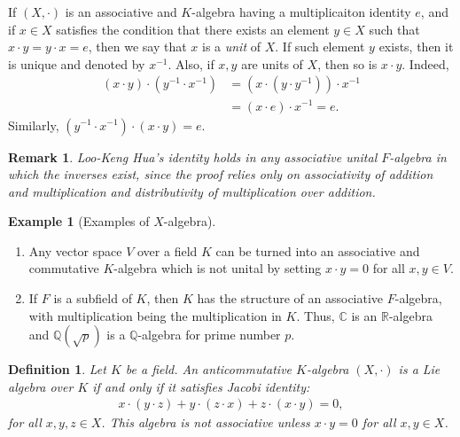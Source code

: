 \documentclass[10pt]{book}
\newtheorem{definition}{Definition}[chapter]
\newtheorem{remark}{Remark}[chapter]
\theoremstyle{definition}
\newtheorem{example}{Example}[chapter]
\numberwithin{equation}{chapter}
\begin{document}
If $(X,\cdot)$ is an associative and $K$-algebra having a multiplicaiton identity $e$, and if $x\in X$ satisfies the condition that there exists an element $y\in X$ such that $x\cdot y = y\cdot x = e$, then we say that $x$ is a \emph{unit} of $X$. If such element $y$ exists, then it is unique and denoted by $x^{-1}$. Also, if $x,y$ are units of $X$, then so is $x\cdot y$. Indeed,
\begin{align*}
    (x\cdot y)\cdot \left(y^{-1}\cdot x^{-1}\right) & = \left(x\cdot \left(y\cdot y^{-1}\right)\right)\cdot x^{-1} \\
    & = (x\cdot e)\cdot x^{-1} = e.
\end{align*}
Similarly, $\left(y^{-1}\cdot x^{-1}\right)\cdot(x\cdot y) = e$. 
\begin{remark}{\rm \cite{2}}
Loo-Keng Hua’s identity holds in any associative unital $F$-algebra in which the inverses exist, since the proof relies only on associativity of addition and multiplication and distributivity of multiplication over addition.
\end{remark}

\medskip

\begin{example}[Examples of $X$-algebra]
~\begin{enumerate}[label=(\arabic*)]
    \item Any vector space $V$ over a field $K$ can be turned into an associative and commutative $K$-algebra which is not unital by setting $x\cdot y = 0$ for all $x,y\in V$.
    \item If $F$ is a subfield of $K$, then $K$ has the structure of an associative $F$-algebra, with multiplication being the multiplication in $K$. Thus, $\mathbb{C}$ is an $\mathbb{R}$-algebra and $\mathbb{Q}(\sqrt{p})$ is a $\mathbb{Q}$-algebra for prime number $p$.
\end{enumerate}
\end{example}

\medskip

\begin{definition}
Let $K$ be a field. An anticommutative $K$-algebra $(X,\cdot)$ is a Lie algebra over $K$ if and only if it satisfies Jacobi identity:
\begin{align*}
    x\cdot (y\cdot z) + y\cdot (z\cdot x) + z\cdot (x\cdot y) = 0,
\end{align*}
for all $x,y,z\in X$. This algebra is not associative unless $x\cdot y = 0$ for all $x,y\in X$.
\end{definition}
\end{document}
